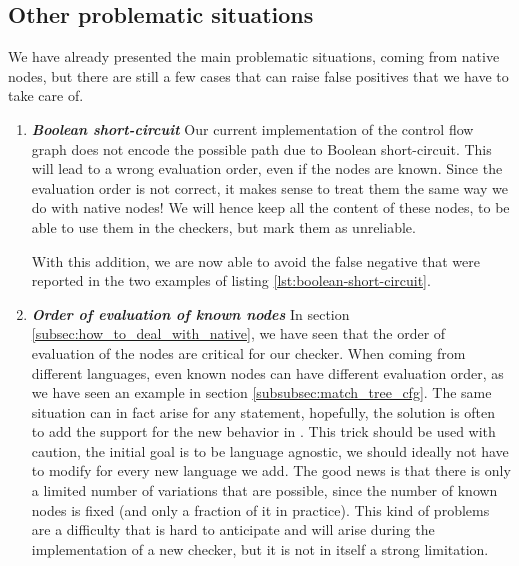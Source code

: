 \subsection{Other problematic situations}
\label{subsec:other_problematic_situation}
	
We have already presented the main problematic situations, coming from native nodes, but there are still a few cases that can raise false positives that we have to take care of.

\begin{enumerate}
	\item \textbf{\textit{Boolean short-circuit}} \newline 
	\label{subsubsec:boolean_short_circuit}
	Our current implementation of the control flow graph does not encode the possible path due to Boolean short-circuit. 
	This will lead to a wrong evaluation order, even if the nodes are known. 
	Since the evaluation order is not correct, it makes sense to treat them the same way we do with native nodes! 
	We will hence keep all the content of these nodes, to be able to use them in the checkers, but mark them as unreliable. 


	
	With this addition, we are now able to avoid the false negative that were reported in the two examples of listing \ref{lst:boolean-short-circuit}.
	
	\item \textbf{\textit{Order of evaluation of known nodes}} \newline 
	\label{subsubsec:evaluation_known_nodes}
	In section \ref{subsec:how_to_deal_with_native}, we have seen that the order of evaluation of the nodes are critical for our checker.
	When coming from different languages, even known nodes can have different evaluation order, as we have seen an example in section \ref{subsubsec:match_tree_cfg}. 
	The same situation can in fact arise for any statement, hopefully, the solution is often to add the support for the new behavior in \slang{}.
	This trick should be used with caution, the initial goal is to be language agnostic, we should ideally not have to modify \slang{} for every new language we add. 
	The good news is that there is only a limited number of variations that are possible, since the number of known nodes is fixed (and only a fraction of it in practice). 
	This kind of problems are a difficulty that is hard to anticipate and will arise during the implementation of a new checker, but it is not in itself a strong limitation.
	

\end{enumerate}
